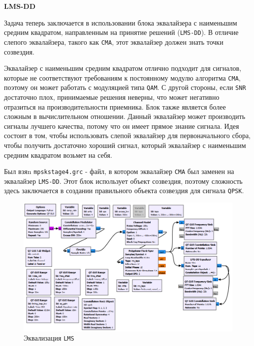 \documentclass[a4paper]{article}
\begin{document}
            \normalsize{\LARGE \textbf{LMS-DD}}
            
            Задача теперь заключается в использовании блока эквалайзера с наименьшим средним квадратом, направленным на принятие решений (\texttt{LMS-DD}). В отличие слепого эквалайзера, такого как \texttt{CMA}, этот эквалайзер должен знать точки созвездия.
            
            Эквалайзер с наименьшим средним квадратом отлично подходит для сигналов, которые не соответствуют требованиям к постоянному модулю алгоритма \texttt{CMA}, поэтому он может работать с модуляцией типа \texttt{QAM}. С другой стороны, если \texttt{SNR} достаточно плох, принимаемые решения неверны, что может негативно отразиться на производительности приемника. Блок также является более сложным в вычислительном отношении. Данный эквалайзер может производить сигналы лучшего качества, потому что он имеет прямое знание сигнала. Идея состоит в том, чтобы использовать слепой эквалайзер для первоначального сбора, чтобы получить достаточно хороший сигнал, который эквалайзер с наименьшим средним квадратом возьмет на себя.
            
            Был взяn \texttt{mpskstage4.grc} - файл, в котором эквалайзер \texttt{CMA} был заменен на эквалайзер \texttt{LMS-DD}. Этот блок использует объект созвездия, поэтому сложность здесь заключается в создании правильного объекта созвездия для сигнала \texttt{QPSK}.
            
            \begin{figure}[H]
                \centering
                \includegraphics[width=\textwidth]{ex_6_3.png}
                \caption{Эквализация \texttt{LMS}}
                \label{fig:ex_6_3}
            \end{figure}
            
\end{document}
